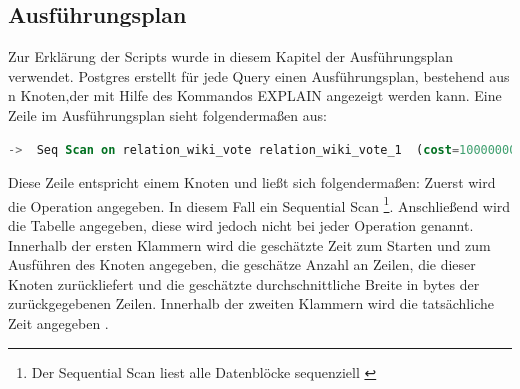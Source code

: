\subsection{Ausführungsplan}
Zur Erklärung der Scripts wurde in diesem Kapitel der Ausführungsplan verwendet. Postgres erstellt für jede Query einen Ausführungsplan, bestehend aus n Knoten,der mit Hilfe des Kommandos
EXPLAIN angezeigt werden kann. Eine Zeile im Ausführungsplan sieht folgendermaßen aus:
\begin{lstlisting}[language=SQL,caption = Zeile im Ausführungsplan,frame=single, label={lineInQueryPlan} ]
    ->  Seq Scan on relation_wiki_vote relation_wiki_vote_1  (cost=10000000000.00..10000001649.62 rows=100762 width=8) (actual time=0.002..4.758 rows=100762 loops=1)
\end{lstlisting}
Diese Zeile entspricht einem Knoten und ließt sich folgendermaßen: Zuerst wird die Operation angegeben. In diesem Fall ein Sequential Scan \footnote{Der Sequential Scan liest alle Datenblöcke sequenziell
\cite[S.211]{froehlich01}}. Anschließend wird die Tabelle angegeben, diese wird jedoch nicht bei jeder Operation genannt. Innerhalb der ersten Klammern wird die geschätzte
Zeit zum Starten und zum Ausführen des Knoten angegeben, die geschätze Anzahl an Zeilen, die dieser Knoten zurückliefert und die geschätzte durchschnittliche Breite
in bytes der zurückgegebenen Zeilen. Innerhalb der zweiten Klammern wird die tatsächliche Zeit angegeben \cite{postgresQueryPlan}.

